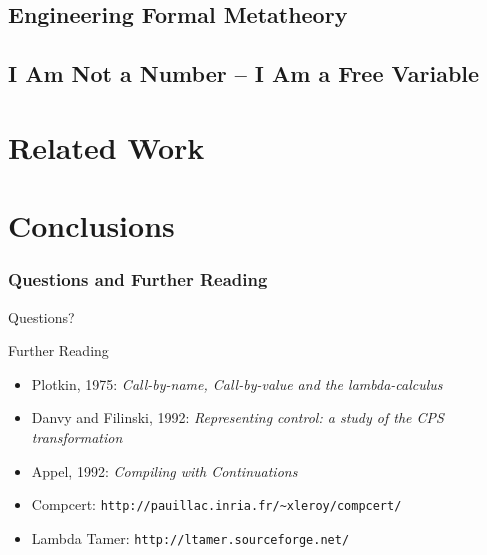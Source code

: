 \documentclass[notheorems]{beamer}
\begin{document}
\subsection{Engineering Formal Metatheory}


\subsection{I Am Not a Number -- I Am a Free Variable}


\section{Related Work}




\section{Conclusions}






\begin{frame}

  \frametitle{Questions and Further Reading}

  Questions?\\[4em]

  \begin{block}{Further Reading}
    \begin{itemize}
      \item Plotkin, 1975: {\em Call-by-name, Call-by-value and the lambda-calculus}
      \item Danvy and Filinski, 1992: {\em Representing control: a study of the CPS transformation}
      \item Appel, 1992: {\em Compiling with Continuations}
      \item Compcert: \texttt{http://pauillac.inria.fr/\~{}xleroy/compcert/}
      \item Lambda Tamer: \texttt{http://ltamer.sourceforge.net/}
    \end{itemize}
  \end{block}

\end{frame}
\end{document}
